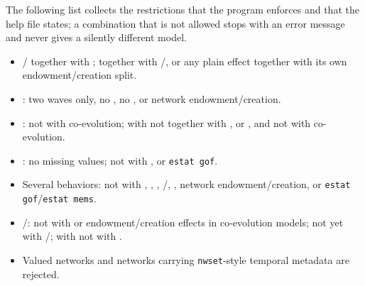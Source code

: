 The following list collects the restrictions that the program enforces and that the help file states; a combination that is not allowed stops with an error message and never gives a silently different model.
\begin{itemize}[nosep]
  \item {\sloppy {}/ together with ;  together with /, or any plain effect together with its own endowment/creation split.\par}
  \item {}: two waves only, no , no ,  or network endowment/creation.
  \item {}: not with co-evolution; with  not together with ,  or , and not with co-evolution.
  \item {}: no missing values; not with ,  or \texttt{estat gof}.
  \item Several behaviors: not with , , , /, , network endowment/creation, or \texttt{estat gof}/\texttt{estat mems}.
  \item {}/: not with  or endowment/creation effects in co-evolution models; not yet with /; with  not with .
  \item Valued networks and networks carrying \texttt{nwset}-style temporal metadata are rejected.
\end{itemize}
